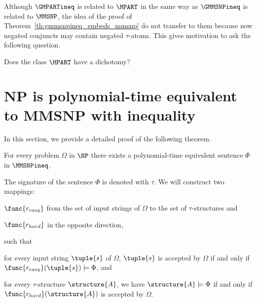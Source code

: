 \documentclass{lmcs}
\begin{document}
Although $\GMPARTineq$ is related to $\MPART$ in the same way as $\GMMSNPineq$ is related to $\MMSNP$, the idea of the proof of Theorem~\ref{th:gmmsnpineq_embeds_mmsnp} do not transfer to them because now negated conjuncts may contain negated $\tau$-atoms. 
%
This gives motivation to ask the following question.
\begin{qu}
Does the class $\MPART$ have a dichotomy?
\end{qu}

























\section{NP is polynomial-time equivalent to MMSNP with inequality}\label{section:snp_subclasses}

In this section, we provide a detailed proof of the following theorem.

\begin{thmC}\label{th:np_subset_mmsnpineq}
For every problem $\Omega$ in $\NP$ there exists a polynomial-time equivalent sentence $\Phi$ in $\MMSNPineq$.
\end{thmC}

The signature of the sentence $\Phi$ is denoted with $\tau$.
%
We will construct two mappings: \begin{inparaenum}[(i)] \item $\func{r_{easy}}$ from the set of input strings of $\Omega$ to the set of $\tau$-structures and \item $\func{r_{hard}}$ in the opposite direction, \end{inparaenum}
such that 
\begin{compactitem}
  \item for every input string $\tuple{s}$ of $\Omega$, $\tuple{s}$ is accepted by $\Omega$ if and only if $\func{r_{easy}}(\tuple{s})\models\Phi$, and 
  \item for every $\tau$-structure $\structure{A}$, we have $\structure{A}\models\Phi$ if and only if $\func{r_{hard}}(\structure{A})$ is accepted by $\Omega$.
\end{compactitem}
\end{document}
